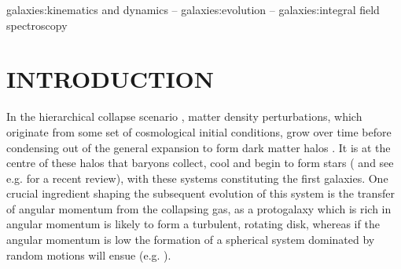\documentclass[fleqn,usenatbib]{mn2e}
\begin{document}
\begin{keywords}
galaxies:kinematics and dynamics -- galaxies:evolution -- galaxies:integral field spectroscopy
\end{keywords}



\section{INTRODUCTION}

In the hierarchical collapse scenario \citep{Rees1977,Fall1980}, matter density perturbations, which originate from some set of cosmological initial conditions, grow over time before condensing out of the general expansion to form dark matter halos \cite{Silk1968,Peebles1970}.
It is at the centre of these halos that baryons collect, cool and begin to form stars (\cite{Birnboim2003,Keres2005,Dekel2006} and see e.g. \cite{Mo2010} for a recent review), with these systems constituting the first galaxies.
One crucial ingredient shaping the subsequent evolution of this system is the transfer of angular momentum from the collapsing gas, as a protogalaxy which is rich in angular momentum is likely to form a turbulent, rotating disk, whereas if the angular momentum is low the formation of a spherical system dominated by random motions will ensue (e.g. \cite{Fall1983}). 
\end{document}
